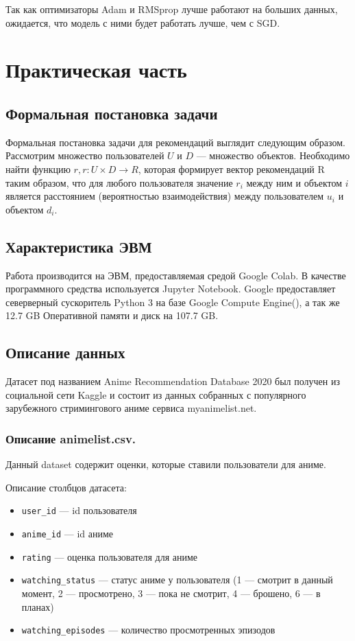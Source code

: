 \documentclass[bachelor, och, diploma]{SCWorks}
\begin{document}
Так как оптимизаторы Adam и RMSprop  лучше работают на больших данных, ожидается, что модель с ними будет работать лучше, чем с SGD.


\section{Практическая часть}
\subsection{Формальная постановка задачи}
Формальная постановка задачи для рекомендаций выглядит следующим образом. 
Рассмотрим множество пользователей $U$ и $D$ --- множество объектов. 
Необходимо найти функцию $r, r : U \times D \rightarrow R$, которая
 формирует вектор рекомендаций R таким образом, что для любого пользователя
значение $r_i$ между ним и объектом $i$ является расстоянием 
  (вероятностью взаимодействия)  между пользователем $u_i$ и объектом $d_i$.

\subsection{Характеристика ЭВМ}
Работа производится на ЭВМ, предоставляемая средой Google Colab. В качестве программного средства используется Jupyter Notebook.
Google предоставляет северверный сускоритель Python 3 на базе Google Compute Engine(), а так же 12.7 GB Оперативной памяти и диск на 107.7 GB.

\subsection{Описание данных}

Датасет под названием Anime Recommendation Database 2020 был получен из социальной сети Kaggle и состоит из данных собранных с популярного зарубежного стримингового аниме сервиса myanimelist.net.

\subsubsection{Описание animelist.csv.}
Данный dataset содержит оценки, которые ставили пользователи для аниме.

Описание столбцов датасета:
\begin{itemize}
	\item \verb|user_id| --- id пользователя
	\item \verb|anime_id| --- id аниме
	\item \verb|rating|  --- оценка пользователя для аниме
	\item \verb|watching_status|  --- статус аниме у пользователя (1 --- смотрит в данный момент, 2 --- просмотрено, 3 --- пока не смотрит, 4 --- брошено, 6 --- в планах)
	\item \verb|watching_episodes| --- количество просмотренных эпизодов
\end{itemize}
\end{document}
